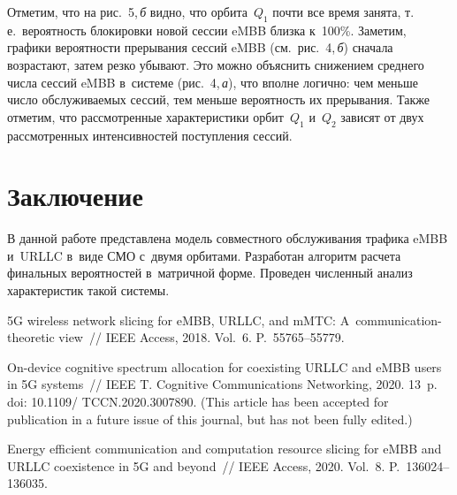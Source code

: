 \begin{multicols}{2}
Отметим, что на рис.~5,\,\textit{б} видно, что орбита~$Q_1$ почти все время занята, т.\,е.\ вероятность 
блокировки новой сессии \mbox{eMBB} близка к~100\%. Заметим, графики вероятности прерывания сессий \mbox{eMBB} 
(см.\ рис.~4,\,\textit{б}) сначала возрастают, затем резко убывают. Это можно объяснить снижением среднего числа
 сессий \mbox{eMBB} в~системе (рис.~4,\,\textit{а}), что вполне логично: чем меньше число обслуживаемых сессий, 
 тем меньше вероятность их прерывания.
Также отметим, что рассмотренные характеристики орбит~$Q_1$ и~$Q_2$ зависят от двух рассмотренных 
интенсивностей поступления сессий.

\section{Заключение}

В данной  работе представлена модель совместного обслуживания трафика \mbox{eMBB} и~URLLC в~виде СМО с~двумя 
орбитами. Разработан алгоритм расчета финальных вероятностей в~матричной форме. Проведен численный анализ 
характеристик такой системы.


\vspace*{-6pt}


{\small\frenchspacing
 {%
 \begin{thebibliography}{9}
 
 \vspace*{-2pt}

 5G wireless network slicing for \mbox{eMBB}, 
URLLC, and mMTC: A~communication-theoretic view~// IEEE Access, 2018. Vol.~6. 
P.~55765--55779.

  On-device cognitive spectrum allocation for 
coexisting URLLC and eMBB users in 5G systems~// IEEE T. Cognitive Communications 
 Networking, 2020. 13~p. doi: 10.1109/ \mbox{TCCN}.2020.3007890.
(This article has been accepted for publication in a future issue of this journal, but 
has not been fully edited.) %

Energy efficient communication and computation resource slicing for \mbox{eMBB} and URLLC 
coexistence in 5G and beyond~// IEEE Access, 2020. Vol.~8. P.~136024--136035.


\end{thebibliography}}}
\end{multicols}
